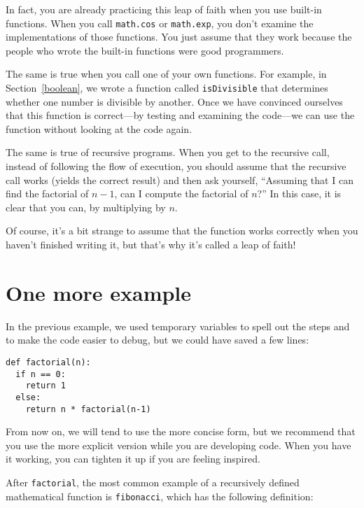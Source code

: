 In fact, you are already practicing this leap of faith when you use
built-in functions.  When you call {\tt math.cos} or {\tt math.exp},
you don't examine the implementations of those functions.  You just
assume that they work because the people who wrote the built-in
functions were good programmers.

The same is true when you call one of your own functions.  For example,
in Section~\ref{boolean}, we wrote a function called {\tt isDivisible}
that determines whether one number is divisible by another.  Once we
have convinced ourselves that this function is correct---by testing
and examining the code---we can use the function without looking
at the code again.


The same is true of recursive programs.  When you get to the recursive
call, instead of following the flow of execution, you should assume
that the recursive call works (yields the correct result) and then ask
yourself, ``Assuming that I can find the factorial of $n-1$, can I
compute the factorial of $n$?''  In this case, it is clear that you
can, by multiplying by $n$.

Of course, it's a bit strange to assume that the function works
correctly when you haven't finished writing it, but that's why
it's called a leap of faith!


\section{One more example}
\label{one more example}

In the previous example, we used temporary variables to spell out
the steps and to make the code easier to debug, but we could have
saved a few lines:

\beforeverb
\begin{verbatim}
def factorial(n):
  if n == 0:
    return 1
  else:
    return n * factorial(n-1)
\end{verbatim}
\afterverb
%
From now on, we will tend to use the more concise form, but we
recommend that you use the more explicit version while you are developing
code.  When you have it working, you can tighten it up if you are
feeling inspired.


After {\tt factorial}, the most common example of a recursively defined
mathematical function is {\tt fibonacci}, which has the following definition:

